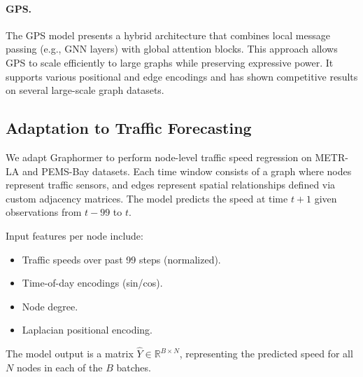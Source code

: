 \documentclass[runningheads]{llncs}
\begin{document}
\paragraph{GPS.}
The GPS model \cite{rampasek2022gps} presents a hybrid architecture that combines local message passing (e.g., GNN layers) with global attention blocks. This approach allows GPS to scale efficiently to large graphs while preserving expressive power. It supports various positional and edge encodings and has shown competitive results on several large-scale graph datasets.

\subsection{Adaptation to Traffic Forecasting}
We adapt Graphormer to perform node-level traffic speed regression on METR-LA and PEMS-Bay datasets. Each time window consists of a graph where nodes represent traffic sensors, and edges represent spatial relationships defined via custom adjacency matrices. The model predicts the speed at time \( t+1 \) given observations from \( t-99 \) to \( t \).

Input features per node include:
\begin{itemize}
    \item Traffic speeds over past 99 steps (normalized).
    \item Time-of-day encodings (sin/cos).
    \item Node degree.
    \item Laplacian positional encoding.
\end{itemize}

The model output is a matrix \( \hat{Y} \in \mathbb{R}^{B \times N} \), representing the predicted speed for all \( N \) nodes in each of the \( B \) batches.
\end{document}
